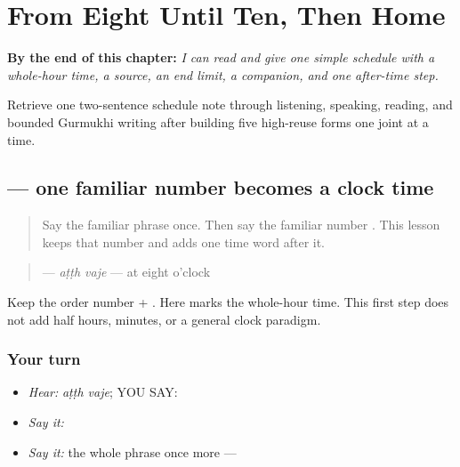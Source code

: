 
\chapter{From Eight Until Ten, Then Home}
\label{ch:pa-a2-schedule-sequence}

\begin{chapteropening}
\textbf{By the end of this chapter:} \emph{I can read and give one simple schedule with a whole-hour time, a source, an end limit, a companion, and one after-time step.}

Retrieve one two-sentence schedule note through listening, speaking, reading, and bounded Gurmukhi writing after building five high-reuse forms one joint at a time.
\end{chapteropening}

\section[\texorpdfstring{\pa{ਅੱਠ} \pa{ਵਜੇ} (atth vaje)}{ਅੱਠ ਵਜੇ (atth vaje)}]{  — one familiar number becomes a clock time}

\label{lesson:PA-C178-vaje}



\begin{quote}
Say the familiar phrase \textbf{    } once. Then say the familiar number \textbf{}. This lesson keeps that number and adds one time word after it.
\end{quote}

\begin{grammarlens}[title={Grammar Lens: \pa{ਵਜੇ} follows the whole hour}]
\begin{quote}
\textbf{ } — \emph{aṭṭh vaje} — at eight o'clock
\end{quote}

Keep the order number + \textbf{}. Here \textbf{} marks the whole-hour time. This first step does not add half hours, minutes, or a general clock paradigm.
\end{grammarlens}

\subsection*{Your turn}
\begin{itemize}
\raggedright
  \item \emph{Hear:} \emph{aṭṭh vaje}; YOU SAY: \textbf{ }
  \item \emph{Say it:} \textbf{ }
  \item \emph{Say it:} the whole phrase once more — \textbf{ }
\end{itemize}

